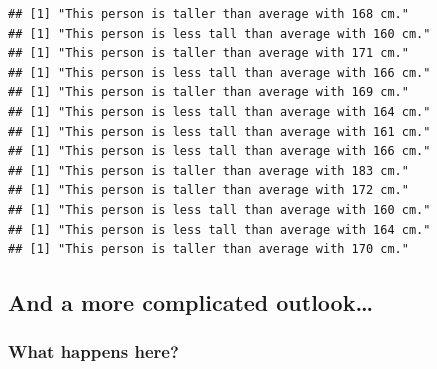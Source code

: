\documentclass[
]{book}
\begin{document}
\begin{verbatim}
## [1] "This person is taller than average with 168 cm."
## [1] "This person is less tall than average with 160 cm."
## [1] "This person is taller than average with 171 cm."
## [1] "This person is less tall than average with 166 cm."
## [1] "This person is taller than average with 169 cm."
## [1] "This person is less tall than average with 164 cm."
## [1] "This person is less tall than average with 161 cm."
## [1] "This person is less tall than average with 166 cm."
## [1] "This person is taller than average with 183 cm."
## [1] "This person is taller than average with 172 cm."
## [1] "This person is less tall than average with 160 cm."
## [1] "This person is less tall than average with 164 cm."
## [1] "This person is taller than average with 170 cm."
\end{verbatim}

\subsection{And a more complicated outlook\ldots{}}\label{and-a-more-complicated-outlook}

\subsubsection{What happens here?}\label{what-happens-here}
\end{document}
